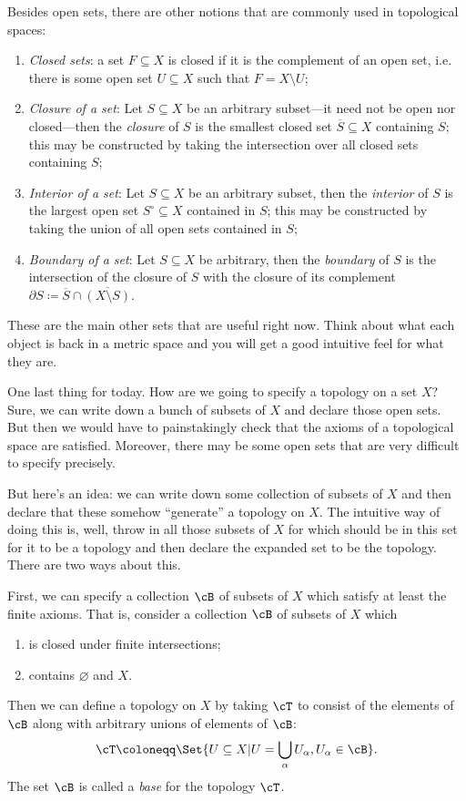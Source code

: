 \documentclass{axolotl}
\begin{document}
Besides open sets, there are other notions that are commonly used in
topological spaces:
\begin{enumerate}
  \item \textit{Closed sets}: a set \(F \subseteq X\) is closed if it is the
    complement of an open set, i.e. there is some open set \(U \subseteq X\)
    such that \(F = X \setminus U\);
  \item \textit{Closure of a set}: Let \(S \subseteq X\) be an arbitrary subset---it need not
    be open nor closed---then the \textit{closure} of \(S\) is the smallest closed
    set \(\overline S \subseteq X\) containing \(S\); this may be constructed by
    taking the intersection over all closed sets containing \(S\);
  \item \textit{Interior of a set}: Let \(S \subseteq X\) be an arbitrary subset, then
    the \textit{interior} of \(S\) is the largest open set \(S^\circ \subseteq X\)
    contained in \(S\); this may be constructed by taking the union of all
    open sets contained in \(S\);
  \item \textit{Boundary of a set}: Let \(S \subseteq X\) be arbitrary, then
    the \textit{boundary} of \(S\) is the intersection of the closure of \(S\)
    with the closure of its complement \(\partial S \coloneqq \overline S \cap
      \overline{(X \setminus S)}\).
\end{enumerate}
These are the main other sets that are useful right now. Think about what each
object is back in a metric space and you will get a good intuitive feel for what
they are.

\label{10-31.2}
One last thing for today. How are we going to specify a topology on a set
\(X\)? Sure, we can write down a bunch of subsets of \(X\) and declare those
open sets. But then we would have to painstakingly check that the axioms of a
topological space are satisfied. Moreover, there may be some open sets that are
very difficult to specify precisely.

But here's an idea: we can write down some collection of subsets of \(X\) and
then declare that these somehow ``generate'' a topology on \(X\). The intuitive
way of doing this is, well, throw in all those subsets of \(X\) for which should
be in this set for it to be a topology and then declare the expanded set to be
the topology. There are two ways about this.

First, we can specify a collection \(\cB\) of subsets of \(X\) which satisfy
at least the finite axioms. That is, consider a collection \(\cB\) of subsets
of \(X\) which
\begin{enumerate}
  \item is closed under finite intersections;
  \item contains \(\varnothing\) and \(X\).
\end{enumerate}
Then we can define a topology on \(X\) by taking \(\cT\) to consist of the
elements of \(\cB\) along with arbitrary unions of elements of \(\cB\):
\[ \cT \coloneqq \Set{U \subseteq X | U = \bigcup_\alpha U_\alpha, U_\alpha \in \cB}. \]
The set \(\cB\) is called a \textit{base} for the topology \(\cT\).
\end{document}
